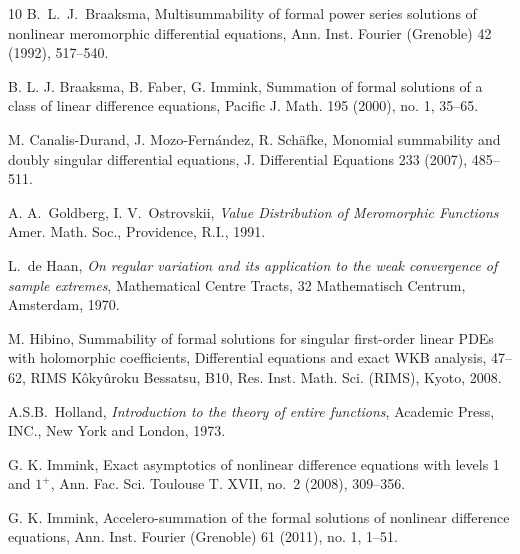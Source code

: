 \documentclass[11pt,a4paper]{article}
\theoremstyle{definition}
\begin{document}
\begin{thebibliography}{10}
 B.~L.~J.~Braaksma,
Multisummability of formal power series solutions of nonlinear meromorphic
differential equations, Ann. Inst. Fourier (Grenoble) 42 (1992), 517--540.

 B. L. J. Braaksma, B. Faber, G. Immink, Summation of formal solutions of a class
of linear difference equations, Pacific J. Math. 195 (2000), no. 1, 35--65.

 M. Canalis-Durand, J. Mozo-Fern\'andez, R. Sch\"afke, Monomial summability
and doubly singular differential equations, J. Differential Equations 233 (2007), 485--511.



A. A.~Goldberg, I. V.~Ostrovskii,
\emph{Value Distribution of Meromorphic Functions}
Amer. Math. Soc., Providence, R.I., 1991.


 L.~de Haan, \emph{On regular variation and its application to the weak convergence of sample extremes},
Mathematical Centre Tracts, 32 Mathematisch Centrum, Amsterdam, 1970.

 M. Hibino, Summability of formal solutions for singular first-order linear PDEs with
holomorphic coefficients, Differential equations and exact WKB analysis, 47--62, RIMS K\^oky\^uroku
Bessatsu, B10, Res. Inst. Math. Sci. (RIMS), Kyoto, 2008.

 A.S.B.~Holland, \emph{Introduction to the theory of entire functions}, Academic Press, INC.,
New York and London, 1973.

 G. K. Immink, Exact asymptotics of nonlinear difference equations with levels 1 and $1^+$,
Ann. Fac. Sci. Toulouse T. XVII, no.\ 2 (2008), 309--356.

 G. K. Immink, Accelero-summation of the formal solutions of nonlinear difference equations,
Ann. Inst. Fourier (Grenoble) 61 (2011), no. 1, 1--51.


\end{thebibliography}
\end{document}
